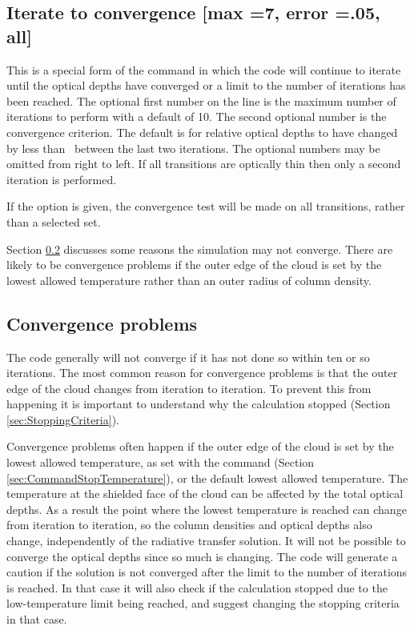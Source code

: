 \subsection{Iterate to convergence [max =7, error =.05, all] }

This is a special form of the  command
in which the code will
continue to iterate until the optical depths have converged or a limit to
the number of iterations has been reached.
The optional first number on
the line is the maximum number of iterations to perform with a default of
10.  The second optional number is the convergence criterion.
The default
is for relative optical depths to have changed by less than \autocv\ between
the last two iterations.
The optional numbers may be omitted from right
to left.
If all transitions are optically thin then only a second iteration
is performed.

If the  option is given, the convergence test will be
made on all transitions, rather than a selected set.

Section \ref{sec:ConvergenceProblems} discusses some reasons the
simulation may not converge.  
There are likely to be convergence problems if the outer edge of the cloud
is set by the lowest allowed temperature rather than an outer radius of column density.

\subsection{Convergence problems}
\label{sec:ConvergenceProblems}

The code generally will not converge if it has not done so within ten
or so iterations.
The most common reason for convergence problems is that
the outer edge of the cloud changes from iteration to iteration.
To prevent this from happening it is important to understand why the
calculation stopped (Section \ref{sec:StoppingCriteria}).

Convergence problems often happen if the outer edge of the cloud is set by
the lowest allowed temperature, as set with the
 command (Section \ref{sec:CommandStopTemperature}),
or the default lowest allowed temperature.
The temperature at the shielded face of the cloud can be affected by the total optical depths.
As a result the point where the lowest temperature is reached can change from
iteration to iteration, so the column densities and optical depths also change,
independently of the radiative transfer solution.
It will not be possible to converge the optical depths since so much is changing.
The code will generate a caution if the solution is not converged after
the limit to the number of iterations is reached.
In that case it will also check if the calculation stopped due to the low-temperature limit
being reached, and suggest changing the stopping criteria in that case.

